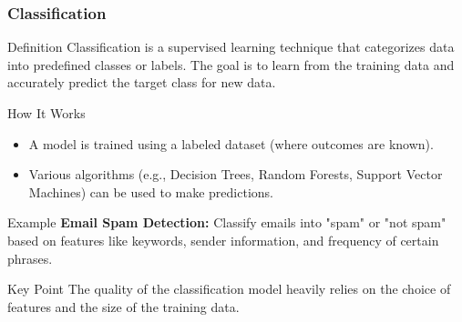 \documentclass{beamer}
\begin{document}
\begin{frame}[fragile]
    \frametitle{Classification}
    \begin{block}{Definition}
        Classification is a supervised learning technique that categorizes data into predefined classes or labels. The goal is to learn from the training data and accurately predict the target class for new data.
    \end{block}
    
    \begin{block}{How It Works}
        \begin{itemize}
            \item A model is trained using a labeled dataset (where outcomes are known).
            \item Various algorithms (e.g., Decision Trees, Random Forests, Support Vector Machines) can be used to make predictions.
        \end{itemize}
    \end{block}
    
    \begin{block}{Example}
        \textbf{Email Spam Detection:} Classify emails into "spam" or "not spam" based on features like keywords, sender information, and frequency of certain phrases.
    \end{block}
    
    \begin{block}{Key Point}
        The quality of the classification model heavily relies on the choice of features and the size of the training data.
    \end{block}
\end{frame}
\end{document}
